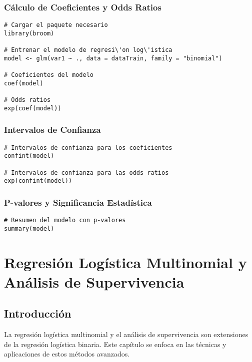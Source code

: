 \documentclass[a4paper]{report} %
\begin{document}
\subsection{C\'alculo de Coeficientes y Odds Ratios}

\begin{verbatim}
# Cargar el paquete necesario
library(broom)

# Entrenar el modelo de regresi\'on log\'istica
model <- glm(var1 ~ ., data = dataTrain, family = "binomial")

# Coeficientes del modelo
coef(model)

# Odds ratios
exp(coef(model))
\end{verbatim}

\subsection{Intervalos de Confianza}

\begin{verbatim}
# Intervalos de confianza para los coeficientes
confint(model)

# Intervalos de confianza para las odds ratios
exp(confint(model))
\end{verbatim}

\subsection{P-valores y Significancia Estad\'istica}

\begin{verbatim}
# Resumen del modelo con p-valores
summary(model)
\end{verbatim}


\chapter{Regresi\'on Log\'istica Multinomial y An\'alisis de Supervivencia}
\section{Introducci\'on}

La regresi\'on log\'istica multinomial y el an\'alisis de supervivencia son extensiones de la regresi\'on log\'istica binaria. Este cap\'itulo se enfoca en las t\'ecnicas y aplicaciones de estos m\'etodos avanzados.
\end{document}
